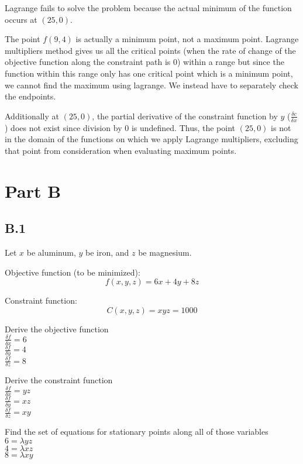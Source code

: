 \documentclass[11pt]{article}
\begin{document}
    Lagrange fails to solve the problem because the actual minimum of the
function occurs at \((25,0)\).

The point \(f(9,4)\) is actually a minimum point, not a maximum point.
Lagrange multipliers method gives us all the critical points (when the
rate of change of the objective function along the constraint path is 0)
within a range but since the function within this range only has one
critical point which is a minimum point, we cannot find the maximum
using lagrange. We instead have to separately check the endpoints.

Additionally at \((25,0)\), the partial derivative of the constraint
function by \(y\) (\(\frac{\delta c}{\delta x}\)) does not exist since
division by 0 is undefined. Thus, the point \((25,0)\) is not in the
domain of the functions on which we apply Lagrange multipliers,
excluding that point from consideration when evaluating maximum points.

    \section{Part B}\label{part-b}

\subsection{B.1}\label{b.1}

Let \(x\) be aluminum, \(y\) be iron, and \(z\) be magnesium.

Objective function (to be minimized):\\
\[f(x,y,z) = 6x+4y+8z\]

Constraint function:\\
\[C(x,y,z) = xyz = 1000\]

    Derive the objective function\\
\(\frac{\delta f}{\delta x} = 6\)\\
\(\frac{\delta f}{\delta y} = 4\)\\
\(\frac{\delta f}{\delta z} = 8\)

Derive the constraint function\\
\(\frac{\delta f}{\delta x} = yz\)\\
\(\frac{\delta f}{\delta y} = xz\)\\
\(\frac{\delta f}{\delta z} = xy\)

Find the set of equations for stationary points along all of those
variables\\
\(6 = \lambda yz\)\\
\(4 = \lambda xz\)\\
\(8 = \lambda xy\)
\end{document}
